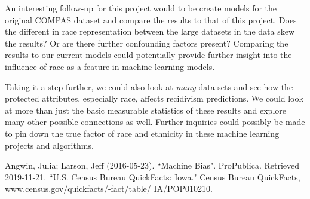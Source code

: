 \documentclass[11pt, sigconf]{acmart}
\begin{document}
\hspace{5mm}An interesting follow-up for this project would to be create models for the original COMPAS dataset and compare the results to that of this project. Does the different in race representation between the large datasets in the data skew the results? Or are there further confounding factors present? Comparing the results to our current models could potentially provide further insight into the influence of race as a feature in machine learning models. 

Taking it a step further, we could also look at \emph{many} data sets and see how the protected attributes, especially race, affects recidivism predictions. We could look at more than just the basic measurable statistics of these results and explore many other possible connections as well. Further inquiries could possibly be made to pin down the true factor of race and ethnicity in these machine learning projects and algorithms. 



\begin{thebibliography}{1}

Angwin, Julia; Larson, Jeff (2016-05-23). ``Machine Bias". ProPublica. Retrieved 2019-11-21.
``U.S. Census Bureau QuickFacts: Iowa." Census Bureau QuickFacts, www.census.gov/quickfacts/-fact/table/
IA/POP010210.

\end{thebibliography}
\end{document}
